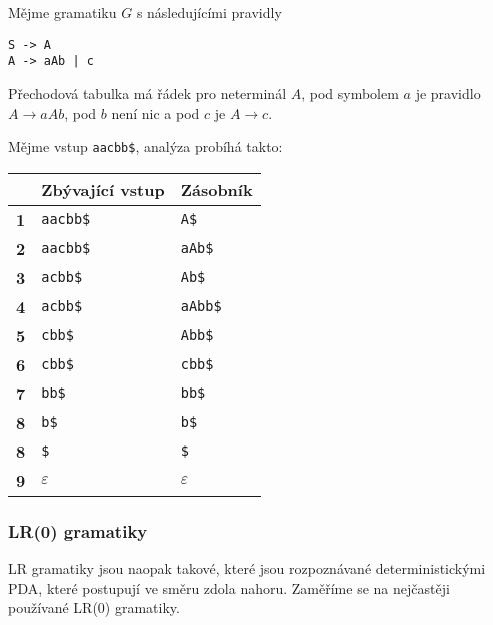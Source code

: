 \begin{example}
Mějme gramatiku $G$ s následujícími pravidly
\begin{verbatim}
S -> A
A -> aAb | c
\end{verbatim}
Přechodová tabulka má řádek pro neterminál $A$,
pod symbolem $a$ je pravidlo $A \to aAb$, pod $b$ není nic a pod $c$ je
$A \to c$.


Mějme vstup \verb|aacbb$|, analýza probíhá takto:

\medskip
\centering
\begin{tabular}{|l|l|l|}
\hline
           & \textbf{Zbývající vstup} & \textbf{Zásobník}    \\ \hline
\textbf{1} & \verb|aacbb$|                  & \verb|A$|      \\ \hline
\textbf{2} & \verb|aacbb$|                  & \verb|aAb$|    \\ \hline
\textbf{3} & \verb|acbb$|                   & \verb|Ab$|     \\ \hline
\textbf{4} & \verb|acbb$|                   & \verb|aAbb$|   \\ \hline
\textbf{5} & \verb|cbb$|                    & \verb|Abb$|    \\ \hline
\textbf{6} & \verb|cbb$|                    & \verb|cbb$|    \\ \hline
\textbf{7} & \verb|bb$|                     & \verb|bb$|     \\ \hline
\textbf{8} & \verb|b$|                      & \verb|b$|      \\ \hline
\textbf{8} & \verb|$|                       & \verb|$|       \\ \hline
\textbf{9} & $\varepsilon$                              & $\varepsilon$          \\ \hline
\end{tabular}
\end{example}

\subsubsection{LR(0) gramatiky}


LR gramatiky jsou naopak takové, které jsou rozpoznávané deterministickými PDA,
které postupují ve směru zdola nahoru. Zaměříme se na nejčastěji
používané LR(0) gramatiky.

